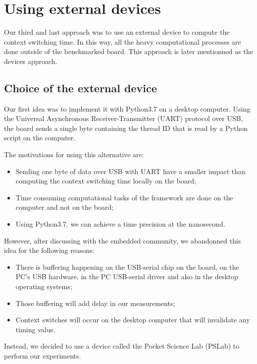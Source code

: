 \section{Using external devices \label{sec:external}}

Our third and last approach was to use an external device to compute the context switching time.
In this way, all the heavy computational processes are done outside of the benchmarked board.
This approach is later mentionned as the devices approach.

\subsection{Choice of the external device}

Our first idea was to implement it with Python3.7 on a desktop computer.
Using the Universal Asynchronous Receiver-Transmitter (UART) protocol over USB, the board sends a single byte containing the thread ID that is read by a Python script on the computer.

The motivations for using this alternative are:
\begin{itemize}
  \item Sending one byte of data over USB with UART have a smaller impact than computing the context switching time locally on the board;
  \item Time consuming computational tasks of the framework are done on the computer and not on the board;
  \item Using Python3.7, we can achieve a time precision at the nanosecond.
\end{itemize}

However, after discussing with the embedded community, we abandonned this idea for the following reasons:
\begin{itemize}
  \item There is buffering happening on the USB-serial chip on the board, on the PC's USB hardware, in the PC USB-serial driver 
    and also in the desktop operating systems;
  \item Those buffering will add delay in our measurements;
  \item Context switches will occur on the desktop computer that will invalidate any timing value.
\end{itemize}


Instead, we decided to use a device called the Pocket Science Lab (PSLab) to perform our experiments.

